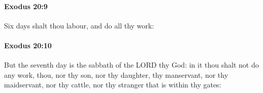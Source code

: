 		\paragraph{Exodus 20:9} %
			\label{EXODUS-20-9}

			Six days shalt thou labour, and do all thy work:


		\paragraph{Exodus 20:10} %
			\label{EXODUS-20-10}

			But the seventh day is the sabbath of the LORD thy God: in it thou shalt not do any work, thou, nor thy son, nor thy daughter, thy manservant, nor thy maidservant, nor thy cattle, nor thy stranger that is within thy gates:



